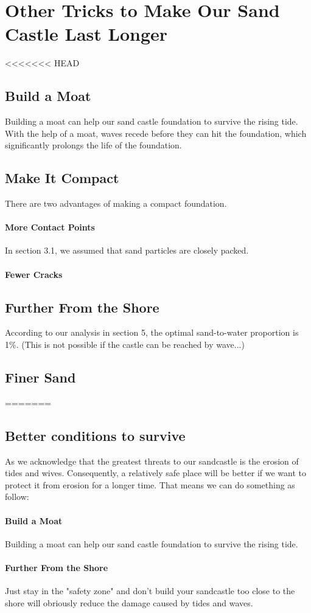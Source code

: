 \documentclass[12pt]{article}
\begin{document}
\section{Other Tricks to Make Our Sand Castle Last Longer}
<<<<<<< HEAD
\subsection{Build a Moat}
Building a moat can help our sand castle foundation to survive the rising tide. With the help of a moat, waves recede before they can hit the foundation, which significantly prolongs the life of the foundation.
\subsection{Make It Compact}
There are two advantages of making a compact foundation. 
\paragraph{More Contact Points}
In section 3.1, we assumed that sand particles are closely packed. 
\paragraph{Fewer Cracks}
\subsection{Further From the Shore}
According to our analysis in section 5, the optimal sand-to-water proportion is 1\%.
(This is not possible if the castle can be reached by wave...)
\subsection{Finer Sand}
=======
\subsection{Better conditions to survive}
As we acknowledge that the greatest threats to our sandcastle is the erosion of tides and wives. Consequently, a relatively safe place will be better if we want to protect it from erosion for a longer time. That means we can do something as follow:
\paragraph{Build a Moat}
Building a moat can help our sand castle foundation to survive the rising tide.
\paragraph{Further From the Shore}
Just stay in the "safety zone" and don't build your sandcastle too close to the shore will obriously reduce the damage caused by tides and waves.
\end{document}
